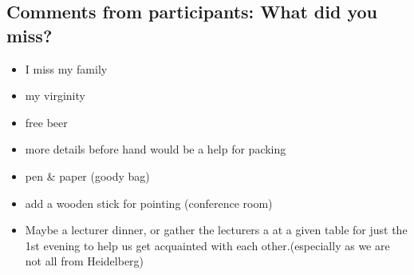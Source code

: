 \documentclass[11pt,a4paper]{article}
\numberwithin{equation}{section}
\numberwithin{table}{section}\setlength{\multlinegap}{25pt}
\begin{document}
\newpage

\subsection{Comments from participants: What did you miss?}
\begin{itemize}
\item I miss my family
\item my virginity
\item free beer
\item more details before hand would be a help for packing
\item pen & paper (goody bag)
\item add a wooden stick for pointing (conference room)
\item Maybe a lecturer dinner, or gather the lecturers a at a given table for just the 1st evening to help us get acquainted with each other.(especially as we are not all from Heidelberg)
\end{itemize}
\end{document}
